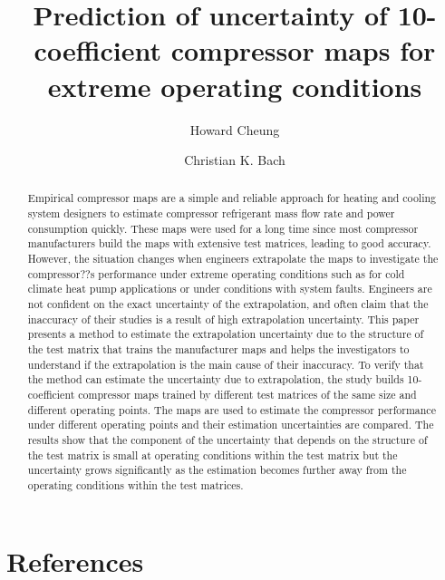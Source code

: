 \documentclass[a4paper]{jpconf}
\begin{document}
\title{Prediction of uncertainty of 10-coefficient compressor maps for extreme operating conditions}

\author{Howard Cheung}

\address{Postdoctoral Research Fellow, Ray W. Herrick Laboratories, School of Mechanical Engineering, Purdue University, 177 S. Russell St., West Lafayette, IN 47907-2031, US}


\author{Christian K. Bach}

\address{Assistant Professor, Mechanical and Aerospace Engineering, Oklahoma State University, 218 Engineering North, Stillwater, OK 74078-5016}


\begin{abstract}
Empirical compressor maps are a simple and reliable approach for heating and cooling system designers to estimate compressor refrigerant mass flow rate and power consumption quickly. These maps were used for a long time since most compressor manufacturers build the maps with extensive test matrices, leading to good accuracy. However, the situation changes when engineers extrapolate the maps to investigate the compressor??s performance under extreme operating conditions such as for cold climate heat pump applications or under conditions with system faults.  Engineers are not confident on the exact uncertainty of the extrapolation, and often claim that the inaccuracy of their studies is a result of high extrapolation uncertainty. This paper presents a method to estimate the extrapolation uncertainty due to the structure of the test matrix that trains the manufacturer maps and helps the investigators to understand if the extrapolation is the main cause of their inaccuracy. To verify that the method can estimate the uncertainty due to extrapolation, the study builds 10-coefficient compressor maps trained by different test matrices of the same size and different operating points. The maps are used to estimate the compressor performance under different operating points and their estimation uncertainties are compared. The results show that the component of the uncertainty that depends on the structure of the test matrix is small at operating conditions within the test matrix but the uncertainty grows significantly as the estimation becomes further away from the operating conditions within the test matrices.
\end{abstract}














\section*{References}




\end{document}
